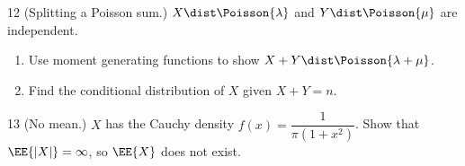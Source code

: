 \documentclass[11pt]{article}
\begin{document}
\begin{problem}{12}
  (Splitting a Poisson sum.) $X \dist \Poisson{\lambda}$ and $Y \dist \Poisson{\mu}$
  are independent.
  \begin{enumerate}
    \item[(a)] Use moment generating functions to show $X + Y \dist \Poisson{\lambda + \mu}$.
    \item[(b)] Find the conditional distribution of $X$ given $X + Y = n$.
  \end{enumerate}
\end{problem}
\vspace{4cm}

\begin{problem}{13}
  (No mean.) $X$ has the Cauchy density $f(x) = \dfrac{1}{\pi(1+x^2)}$. Show that
  $\EE{|X|} = \infty$, so $\EE{X}$ does not exist.
\end{problem}
\vfill
\end{document}
